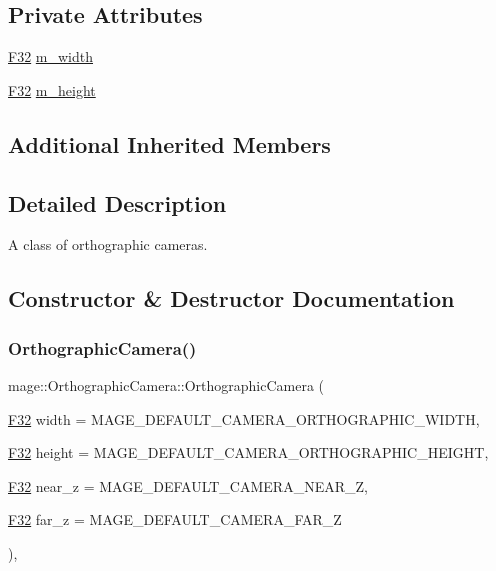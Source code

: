 \subsection*{Private Attributes}
\begin{DoxyCompactItemize}
\item 
\hyperlink{namespacemage_aa97e833b45f06d60a0a9c4fc22ae02c0}{F32} \hyperlink{classmage_1_1_orthographic_camera_a78586ef1dfd4e1ffa5d9b32378a1e7f8}{m\+\_\+width}
\item 
\hyperlink{namespacemage_aa97e833b45f06d60a0a9c4fc22ae02c0}{F32} \hyperlink{classmage_1_1_orthographic_camera_a2bd741a8d76cdb47636792858955fe62}{m\+\_\+height}
\end{DoxyCompactItemize}
\subsection*{Additional Inherited Members}


\subsection{Detailed Description}
A class of orthographic cameras. 

\subsection{Constructor \& Destructor Documentation}
\hypertarget{classmage_1_1_orthographic_camera_a2c99b9827619d168c292172ac21308f1}{}\label{classmage_1_1_orthographic_camera_a2c99b9827619d168c292172ac21308f1} 
\subsubsection{\texorpdfstring{Orthographic\+Camera()}{OrthographicCamera()}\hspace{0.1cm}{\footnotesize\ttfamily [1/3]}}
{\footnotesize\ttfamily mage\+::\+Orthographic\+Camera\+::\+Orthographic\+Camera (\begin{DoxyParamCaption}\item[{\hyperlink{namespacemage_aa97e833b45f06d60a0a9c4fc22ae02c0}{F32}}]{width = {\ttfamily MAGE\+\_\+DEFAULT\+\_\+CAMERA\+\_\+ORTHOGRAPHIC\+\_\+WIDTH},  }\item[{\hyperlink{namespacemage_aa97e833b45f06d60a0a9c4fc22ae02c0}{F32}}]{height = {\ttfamily MAGE\+\_\+DEFAULT\+\_\+CAMERA\+\_\+ORTHOGRAPHIC\+\_\+HEIGHT},  }\item[{\hyperlink{namespacemage_aa97e833b45f06d60a0a9c4fc22ae02c0}{F32}}]{near\+\_\+z = {\ttfamily MAGE\+\_\+DEFAULT\+\_\+CAMERA\+\_\+NEAR\+\_\+Z},  }\item[{\hyperlink{namespacemage_aa97e833b45f06d60a0a9c4fc22ae02c0}{F32}}]{far\+\_\+z = {\ttfamily MAGE\+\_\+DEFAULT\+\_\+CAMERA\+\_\+FAR\+\_\+Z} }\end{DoxyParamCaption})\hspace{0.3cm}{\ttfamily [explicit]}, {\ttfamily [noexcept]}}

